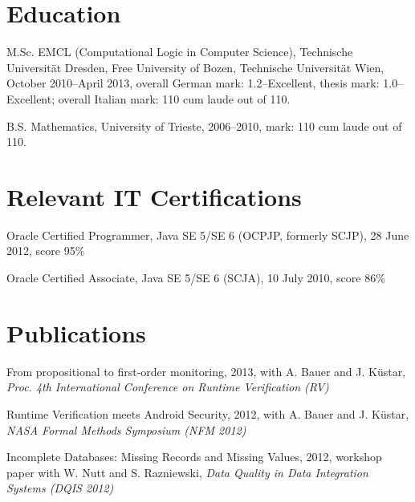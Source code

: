 \documentclass[letterpaper]{article}
\renewenvironment{itemize}{
  \begin{list}{}{
    \setlength{\leftmargin}{1.5em}
  }
}{
  \end{list}
}
\begin{document}
\section*{Education}
\begin{itemize}
  \item M.Sc. EMCL (Computational Logic in Computer Science), Technische Universit\"{a}t Dresden, Free University of Bozen, Technische Universit\"{a}t Wien, October 2010--April 2013, overall German mark: 1.2--Excellent, thesis mark: 1.0--Excellent; overall Italian mark: 110 cum laude out of 110.

  \item B.S. Mathematics, University of Trieste, 2006--2010, mark: 110 cum laude out of 110. 
\end{itemize}

\section*{Relevant IT Certifications}
\begin{itemize}
\item Oracle Certified Programmer, Java SE 5/SE 6 (OCPJP, formerly SCJP), 28 June 2012, score 95\%
\item Oracle Certified Associate, Java SE 5/SE 6 (SCJA), 10 July 2010, score 86\%
\end{itemize}

\section*{Publications}
\begin{itemize}
\item From propositional to first-order monitoring, 2013, with A. Bauer and J. K\"{u}star, {\it Proc. 4th International Conference on Runtime Verification (RV)}

\item Runtime Verification meets Android Security, 2012, with A. Bauer and J. K\"{u}star, {\it NASA Formal Methods Symposium (NFM 2012)}

\item Incomplete Databases: Missing Records and Missing Values, 2012, workshop paper with W. Nutt and S. Razniewski, {\it Data Quality in Data Integration Systems (DQIS 2012)}
\end{itemize}
\end{document}
